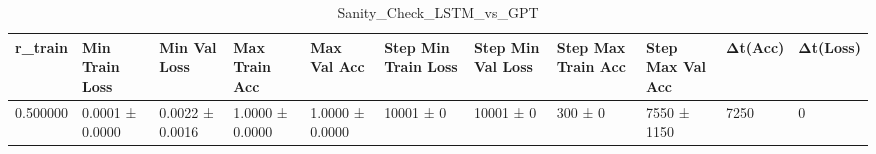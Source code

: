 \begin{table}
\caption{Sanity_Check_LSTM_vs_GPT}
\label{tab:Sanity_Check_LSTM_vs_GPT}
\begin{tabular}{rllllllllll}
\toprule
r_train & Min Train Loss & Min Val Loss & Max Train Acc & Max Val Acc & Step Min Train Loss & Step Min Val Loss & Step Max Train Acc & Step Max Val Acc & Δt(Acc) & Δt(Loss) \\
\midrule
0.500000 & 0.0001 ± 0.0000 & 0.0022 ± 0.0016 & 1.0000 ± 0.0000 & 1.0000 ± 0.0000 & 10001 ± 0 & 10001 ± 0 & 300 ± 0 & 7550 ± 1150 & 7250 & 0 \\
\bottomrule
\end{tabular}
\end{table}
